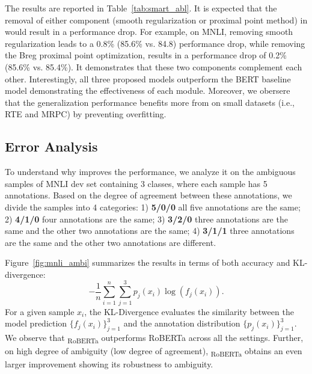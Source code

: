 The results are reported in Table~\ref{tab:smart_abl}. It is expected that the removal of either component (smooth regularization or proximal point method) in {\model} would result in a performance drop. For example, on MNLI, removing smooth regularization leads to a 0.8\% (85.6\% vs. 84.8) performance drop, while removing the Breg proximal point optimization, results in a performance drop of 0.2\% (85.6\% vs. 85.4\%). It demonstrates that these two components complement each other. Interestingly, all three proposed models outperform the BERT baseline model demonstrating the effectiveness of each module. Moreover, we obersere that the generalization performance benefits more from {\model}  on small datasets (i.e., RTE and MRPC) by preventing overfitting. 





















\subsection{Error Analysis}
\label{subsec:error}
To understand why {\model} improves the performance, we analyze it on the ambiguous samples of MNLI dev set containing 3 classes, where each sample has 5 annotations. Based on the degree of agreement between these annotations, we divide the samples into 4 categories: 
1) \textbf{5/0/0} all five annotations are the same; 2) \textbf{4/1/0} four annotations are the same; 3) \textbf{3/2/0} three annotations are the same and the other two annotations are the same; 4) \textbf{3/1/1} three annotations are the same and the other two annotations are different.

Figure~\ref{fig:mnli_ambi} summarizes the results in terms of both accuracy and KL-divergence: $$-\frac{1}{n}\sum_{i=1}^n \sum_{j=1}^3 p_j(x_i)\log(f_j(x_i)).$$ For a given sample $x_i$, the KL-Divergence evaluates the similarity between the model prediction $\{f_j(x_i)\}_{j=1}^3$ and the annotation distribution $\{p_j(x_i)\}_{j=1}^3$. We observe that {\model}\textsubscript{RoBERTa} outperforms RoBERTa across all the settings. Further, on high degree of ambiguity (low degree of agreement), {\model}\textsubscript{RoBERTa} obtains an even larger improvement showing its robustness to ambiguity.  
 




